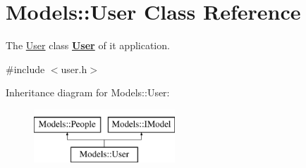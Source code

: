 \hypertarget{classModels_1_1User}{}\section{Models\+:\+:User Class Reference}
\label{classModels_1_1User}


The \hyperlink{classModels_1_1User}{User} class {\bfseries \hyperlink{classModels_1_1User}{User}} of it application.  




{\ttfamily \#include $<$user.\+h$>$}

Inheritance diagram for Models\+:\+:User\+:\begin{figure}[H]
\begin{center}
\leavevmode
\includegraphics[height=2.000000cm]{df/d68/classModels_1_1User}
\end{center}
\end{figure}
